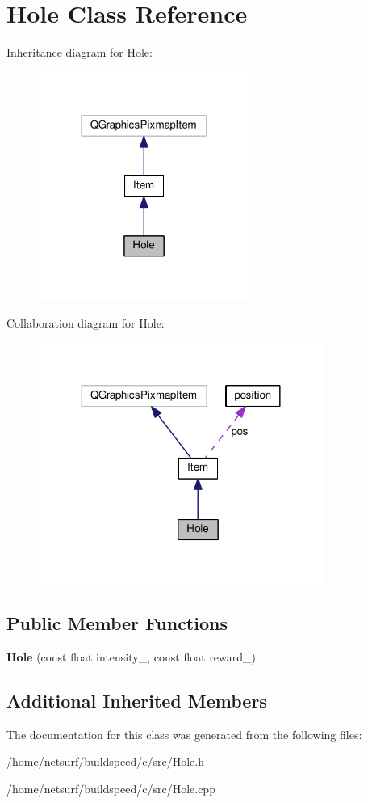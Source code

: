 \hypertarget{class_hole}{}\section{Hole Class Reference}
\label{class_hole}


Inheritance diagram for Hole\+:\nopagebreak
\begin{figure}[H]
\begin{center}
\leavevmode
\includegraphics[width=196pt]{class_hole__inherit__graph}
\end{center}
\end{figure}


Collaboration diagram for Hole\+:\nopagebreak
\begin{figure}[H]
\begin{center}
\leavevmode
\includegraphics[width=264pt]{class_hole__coll__graph}
\end{center}
\end{figure}
\subsection*{Public Member Functions}
\begin{DoxyCompactItemize}
\item 
{\bfseries Hole} (const float intensity\+\_\+, const float reward\+\_\+)\hypertarget{class_hole_abe1a64c7a1c55a7da8fd489d02ea2bc8}{}\label{class_hole_abe1a64c7a1c55a7da8fd489d02ea2bc8}

\end{DoxyCompactItemize}
\subsection*{Additional Inherited Members}


The documentation for this class was generated from the following files\+:\begin{DoxyCompactItemize}
\item 
/home/netsurf/buildspeed/c/src/Hole.\+h\item 
/home/netsurf/buildspeed/c/src/Hole.\+cpp\end{DoxyCompactItemize}
